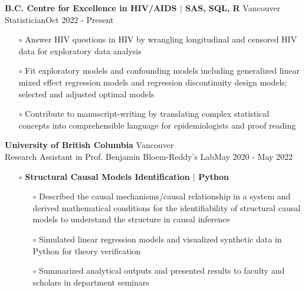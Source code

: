 \documentclass[]{resume}
\begin{document}
 \begin{rSection}{}
   {\bf B.C. Centre for Excellence in HIV/AIDS  $\mid$ SAS, SQL, R} \hfill{Vancouver }\\{ Statistician}\hfill{Oct 2022 - Present }
     \vspace{-0.5em}
     \begin{itemize}\itemsep-0.5em
     \item [$\circ$]Answer HIV questions in HIV by wrangling longitudinal and censored HIV data for exploratory data analysis
         \item[$\circ$]
          Fit exploratory models and confounding models including generalized linear mixed effect regression models and regression discontinuity design models; selected and adjusted optimal models
         \item[$\circ$] Contribute to manuscript-writing by translating complex statistical concepts into comprehensible language for epidemiologists and proof reading
         

\end{itemize}

     {\bf University of British Columbia } \hfill{Vancouver }\\{ Research Assistant in Prof. Benjamin Bloem-Reddy's Lab}\hfill{May 2020 - May 2022 }\begin{itemize}\item[$\circ$] \vspace{-0.5em} \textbf{Structural Causal Models  Identification $\mid$ Python}
     \vspace{-0.5em}
     \begin{itemize}\itemsep-0.5em
     \item [$\circ$]Described the causal mechanisms/causal relationship in a system and derived mathematical conditions for the identifiability of structural causal models to understand the structure in causal inference
         \item[$\circ$]
         Simulated linear regression models and visualized synthetic data in Python for theory verification
         \item[$\circ$] Summarized analytical outputs and presented results to faculty and scholars in department seminars
         

\end{itemize}
\end{itemize}
\end{rSection}
\end{document}

